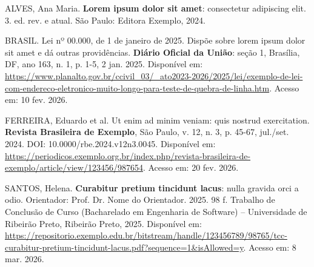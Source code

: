 \newpage
{}

\begingroup
\setlength{\parindent}{0pt}
\raggedright

ALVES, Ana Maria. \textbf{Lorem ipsum dolor sit amet}: consectetur adipiscing elit. 3. ed. rev. e atual. São Paulo: Editora Exemplo, 2024.

\vspace{\baselineskip}

BRASIL. Lei nº 00.000, de 1 de janeiro de 2025. Dispõe sobre lorem ipsum dolor sit amet e dá outras providências. \textbf{Diário Oficial da União}: seção 1, Brasília, DF, ano 163, n. 1, p. 1-5, 2 jan. 2025. Disponível em: \url{https://www.planalto.gov.br/ccivil_03/_ato2023-2026/2025/lei/exemplo-de-lei-com-endereco-eletronico-muito-longo-para-teste-de-quebra-de-linha.htm}. Acesso em: 10 fev. 2026.

\vspace{\baselineskip}

FERREIRA, Eduardo et al. Ut enim ad minim veniam: quis nostrud exercitation. \textbf{Revista Brasileira de Exemplo}, São Paulo, v. 12, n. 3, p. 45-67, jul./set. 2024. DOI: 10.0000/rbe.2024.v12n3.0045. Disponível em: \url{https://periodicos.exemplo.org.br/index.php/revista-brasileira-de-exemplo/article/view/123456/987654}. Acesso em: 20 fev. 2026.

\vspace{\baselineskip}

SANTOS, Helena. \textbf{Curabitur pretium tincidunt lacus}: nulla gravida orci a odio. Orientador: Prof. Dr. Nome do Orientador. 2025. 98 f. Trabalho de Conclusão de Curso (Bacharelado em Engenharia de Software) -- Universidade de Ribeirão Preto, Ribeirão Preto, 2025. Disponível em: \url{https://repositorio.exemplo.edu.br/bitstream/handle/123456789/98765/tcc-curabitur-pretium-tincidunt-lacus.pdf?sequence=1&isAllowed=y}. Acesso em: 8 mar. 2026.

\endgroup
